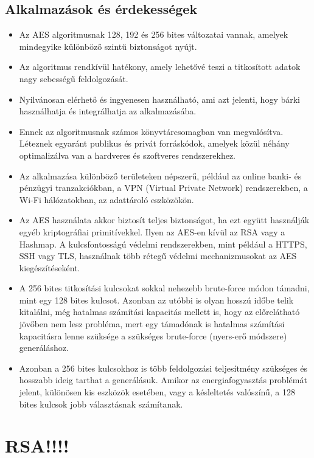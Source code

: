 \pagebreak
\subsection{Alkalmazások és érdekességek}

\begin{itemize}
	\item Az AES algoritmusnak 128, 192 és 256 bites változatai vannak, amelyek mindegyike különböző szintű biztonságot nyújt.
	\item Az algoritmus rendkívül hatékony, amely lehetővé teszi a titkosított adatok nagy sebességű feldolgozását.
	\item Nyilvánosan elérhető és ingyenesen használható, ami azt jelenti, hogy bárki használhatja és integrálhatja az alkalmazásába.
	\item Ennek az algoritmusnak számos könyvtárcsomagban van megvalósítva. Léteznek egyaránt publikus és privát forráskódok, amelyek közül néhány optimalizálva van a hardveres és szoftveres rendszerekhez.
	\item Az alkalmazása különböző területeken népszerű, például az online banki- és pénzügyi tranzakciókban, a VPN (Virtual Private Network) rendszerekben, a Wi-Fi hálózatokban, az adattároló eszközökön.
	\item Az AES használata akkor biztosít teljes biztonságot, ha ezt együtt használják egyéb kriptográfiai primitívekkel. Ilyen az AES-en kívül az RSA vagy a Hashmap. A kulcsfontosságú védelmi rendszerekben, mint például a HTTPS, SSH vagy TLS, használnak több rétegű védelmi mechanizmusokat az AES kiegészítéseként.
	\item A 256 bites titkosítási kulcsokat sokkal nehezebb brute-force módon támadni, mint egy 128 bites kulcsot. Azonban az utóbbi is olyan hosszú időbe telik kitalálni, még hatalmas számítási kapacitás mellett is, hogy az előrelátható jövőben nem lesz probléma, mert egy támadónak is hatalmas számítási kapacitásra lenne szüksége a szükséges brute-force (nyers-erő módszere) generáláshoz.
	\item Azonban a 256 bites kulcsokhoz is több feldolgozási teljesítmény szükséges és hosszabb ideig tarthat a generálásuk. Amikor az energiafogyasztás problémát jelent, különösen kis eszközök esetében, vagy a késleltetés valószínű, a 128 bites kulcsok jobb választásnak számítanak.
\end{itemize}

\section {RSA!!!!}

